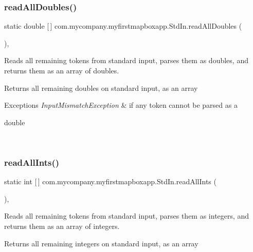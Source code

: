 \subsubsection{\texorpdfstring{read\+All\+Doubles()}{readAllDoubles()}}
{\footnotesize\ttfamily static double \mbox{[}$\,$\mbox{]} com.\+mycompany.\+myfirstmapboxapp.\+Std\+In.\+read\+All\+Doubles (\begin{DoxyParamCaption}{ }\end{DoxyParamCaption})\hspace{0.3cm}{\ttfamily [inline]}, {\ttfamily [static]}}

Reads all remaining tokens from standard input, parses them as doubles, and returns them as an array of doubles. \begin{DoxyReturn}{Returns}
all remaining doubles on standard input, as an array 
\end{DoxyReturn}

\begin{DoxyExceptions}{Exceptions}
{\em Input\+Mismatch\+Exception} & if any token cannot be parsed as a
\begin{DoxyCode}
\textcolor{keywordtype}{double} 
\end{DoxyCode}
 \\
\hline
\end{DoxyExceptions}
\mbox{\label{classcom_1_1mycompany_1_1myfirstmapboxapp_1_1_std_in_a9e0708b89e6cf2886ba908bc03eae3cb}} 
\subsubsection{\texorpdfstring{read\+All\+Ints()}{readAllInts()}}
{\footnotesize\ttfamily static int \mbox{[}$\,$\mbox{]} com.\+mycompany.\+myfirstmapboxapp.\+Std\+In.\+read\+All\+Ints (\begin{DoxyParamCaption}{ }\end{DoxyParamCaption})\hspace{0.3cm}{\ttfamily [inline]}, {\ttfamily [static]}}

Reads all remaining tokens from standard input, parses them as integers, and returns them as an array of integers. \begin{DoxyReturn}{Returns}
all remaining integers on standard input, as an array 
\end{DoxyReturn}

